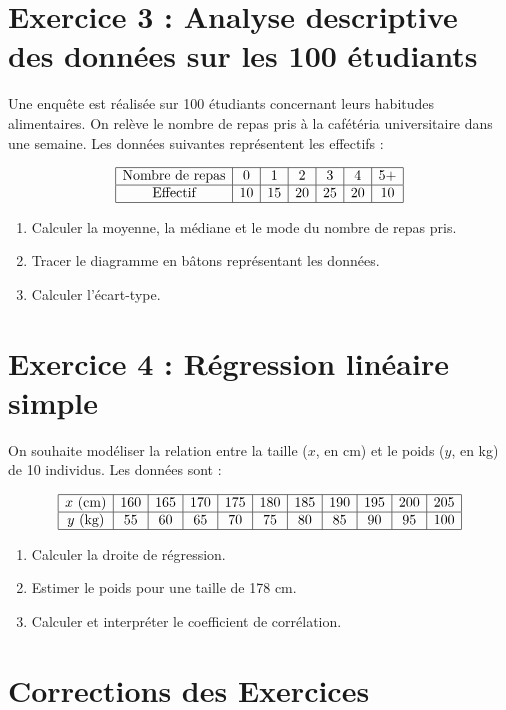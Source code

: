 \documentclass[a4paper,12pt]{article}
\begin{document}
\section*{Exercice 3 : Analyse descriptive des données sur les 100 étudiants}
Une enquête est réalisée sur 100 étudiants concernant leurs habitudes alimentaires. On relève le nombre de repas pris à la cafétéria universitaire dans une semaine. Les données suivantes représentent les effectifs :

\[
\begin{array}{|c|c|c|c|c|c|c|}
\hline
\text{Nombre de repas} & 0 & 1 & 2 & 3 & 4 & 5+ \\
\hline
\text{Effectif} & 10 & 15 & 20 & 25 & 20 & 10 \\
\hline
\end{array}
\]

\begin{enumerate}
    \item Calculer la moyenne, la médiane et le mode du nombre de repas pris.
    \item Tracer le diagramme en bâtons représentant les données.
    \item Calculer l’écart-type.
\end{enumerate}

\section*{Exercice 4 : Régression linéaire simple}
On souhaite modéliser la relation entre la taille ($x$, en cm) et le poids ($y$, en kg) de 10 individus. Les données sont :

\[
\begin{array}{|c|c|c|c|c|c|c|c|c|c|c|}
\hline
x \text{ (cm)} & 160 & 165 & 170 & 175 & 180 & 185 & 190 & 195 & 200 & 205 \\
\hline
y \text{ (kg)} & 55 & 60 & 65 & 70 & 75 & 80 & 85 & 90 & 95 & 100 \\
\hline
\end{array}
\]

\begin{enumerate}
    \item Calculer la droite de régression.
    \item Estimer le poids pour une taille de 178 cm.
    \item Calculer et interpréter le coefficient de corrélation.
\end{enumerate}

\newpage
\section*{Corrections des Exercices}
\end{document}
